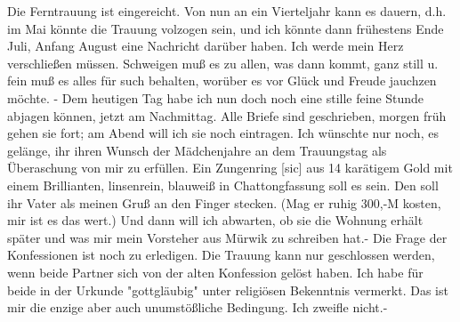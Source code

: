 \def\day{7. 2. 1944}
\mktitle

Die Ferntrauung ist eingereicht.
Von nun an ein Vierteljahr kann es dauern, d.h. im Mai k\"{o}nnte die Trauung volzogen sein, und ich k\"{o}nnte dann fr\"{u}hestens Ende Juli, Anfang August eine Nachricht dar\"{u}ber haben.
Ich werde mein Herz verschlie{\ss}en m\"{u}ssen.
Schweigen mu{\ss} es zu allen, was dann kommt, ganz still u. fein mu{\ss} es alles f\"{u}r such behalten, wor\"{u}ber es vor Gl\"{u}ck und Freude jauchzen m\"{o}chte.
- Dem heutigen Tag habe ich nun doch noch eine stille feine Stunde abjagen k\"{o}nnen, jetzt am Nachmittag.
Alle Briefe sind geschrieben, morgen fr\"{u}h gehen sie fort; am Abend will ich sie noch eintragen.
Ich w\"{u}nschte nur noch, es gel\"{a}nge, ihr ihren Wunsch der M\"{a}dchenjahre an dem Trauungstag als \"{U}beraschung von mir zu erf\"{u}llen.
Ein Zungenring{\color{red} [sic] } aus 14 kar\"{a}tigem Gold mit einem Brillianten, linsenrein, blauwei{\ss} in Chattongfassung soll es sein.
Den soll ihr Vater als meinen Gru{\ss} an den Finger stecken.
(Mag er ruhig 300,-M kosten, mir ist es das wert.)
Und dann will ich abwarten, ob sie die Wohnung erh\"{a}lt sp\"{a}ter und was mir mein Vorsteher aus M\"{u}rwik zu schreiben hat.-
Die Frage der Konfessionen ist noch zu erledigen.
Die Trauung kann nur geschlossen werden, wenn beide Partner sich von der alten Konfession gel\"{o}st haben.
Ich habe f\"{u}r beide in der Urkunde "gottgl\"{a}ubig" unter religi\"{o}sen Bekenntnis vermerkt.
Das ist mir die enzige aber auch unumst\"{o}{\ss}liche Bedingung.
Ich zweifle nicht.-

\clearpage
